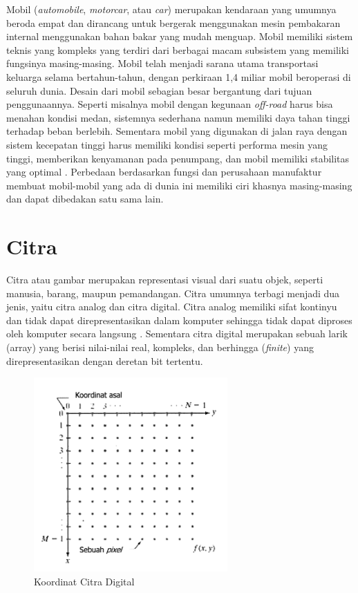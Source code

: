 Mobil (\emph{automobile}, \emph{motorcar}, atau \emph{car}) merupakan kendaraan yang umumnya beroda empat dan dirancang untuk bergerak 
menggunakan mesin pembakaran internal menggunakan bahan bakar yang mudah menguap. Mobil memiliki sistem teknis yang 
kompleks yang terdiri dari berbagai macam subsistem yang memiliki fungsinya masing-masing. Mobil telah menjadi sarana 
utama transportasi keluarga selama bertahun-tahun, dengan perkiraan 1,4 miliar mobil beroperasi di seluruh dunia. Desain 
dari mobil sebagian besar bergantung dari tujuan penggunaannya. Seperti misalnya mobil dengan kegunaan \emph{off-road} harus bisa menahan 
kondisi medan, sistemnya sederhana namun memiliki daya tahan tinggi terhadap beban berlebih. Sementara mobil 
yang digunakan di jalan raya dengan sistem kecepatan tinggi harus memiliki kondisi seperti performa mesin yang tinggi, 
memberikan kenyamanan pada penumpang, dan mobil memiliki stabilitas yang optimal \parencite{Cromer2023}. Perbedaan 
berdasarkan fungsi dan perusahaan manufaktur membuat mobil-mobil yang ada di dunia ini memiliki ciri khasnya masing-masing 
dan dapat dibedakan satu sama lain.

\section{Citra}
\label{sec:citra}

Citra atau gambar merupakan representasi visual dari suatu objek, seperti manusia, barang, maupun pemandangan. Citra 
umumnya terbagi menjadi dua jenis, yaitu citra analog dan citra digital. Citra analog memiliki sifat kontinyu dan tidak 
dapat direpresentasikan dalam komputer sehingga tidak dapat diproses oleh komputer secara langsung \parencite{Tyagi2018}. 
Sementara citra digital merupakan sebuah larik (array) yang berisi nilai-nilai real, kompleks, dan berhingga (\emph{finite}) 
yang direpresentasikan dengan deretan bit tertentu. 

\begin{figure}[ht]
  \centering
  \includegraphics[scale=1]{gambar/Koordinat Citra Digital.png}
  \caption{Koordinat Citra Digital}
  \label{fig:koordinatcitradigital}
\end{figure}


